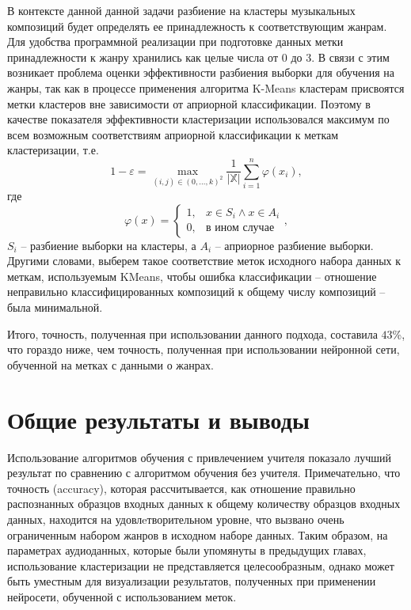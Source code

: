 В контексте данной данной задачи разбиение на кластеры музыкальных композиций будет определять ее принадлежность к соответствующим жанрам.
Для удобства программной реализации при подготовке данных метки принадлежности к жанру
хранились как целые числа от 0 до 3. В связи с этим возникает проблема оценки эффективности
разбиения выборки для обучения на жанры, так как в процессе применения алгоритма K-Means кластерам
присвоятся метки кластеров вне зависимости от априорной классификации. Поэтому в качестве показателя эффективности
кластеризации использовался максимум по всем возможным соответствиям априорной классификации к меткам кластеризации, т.е.
\begin{equation}
	1 - \varepsilon = \underset{(i,j) \in (0, \dots, k)^2}{\max} \frac{1}{\left|\mathbb{X}\right|}\sum_{i=1}^n \varphi(x_i),
\end{equation}
где
	$$\varphi(x) = 
	\begin{cases}
		1, &  x \in S_i \wedge x \in A_i \\
		0, & \text{в ином случае}
	\end{cases}, $$
	$S_i$ -- разбиение выборки на кластеры, а $A_i$ -- априорное разбиение выборки.
Другими словами, выберем такое соответствие меток исходного набора данных к меткам, используемым KMeans, чтобы ошибка классификации -- отношение неправильно классифицированных композиций к общему числу композиций -- была минимальной.

Итого, точность, полученная при использовании данного подхода, составила $43$\%, что гораздо ниже, чем точность, полученная при использовании нейронной сети, обученной на метках с данными о жанрах.

\section{Общие результаты и выводы}

Использование алгоритмов обучения с привлечением учителя показало лучший результат по сравнению с алгоритмом обучения без учителя.
Примечательно, что точность (accuracy), которая рассчитывается, как отношение правильно распознанных образцов входных данных к общему количеству образцов входных данных, находится на удовлeтворительном уровне, что вызвано
очень ограниченным набором жанров в исходном наборе данных. Таким образом, на параметрах аудиоданных, которые были упомянуты в предыдущих главах, использование кластеризации не представляется целесообразным, однако может быть уместным для визуализации результатов, полученных при применении нейросети, обученной с использованием меток.

